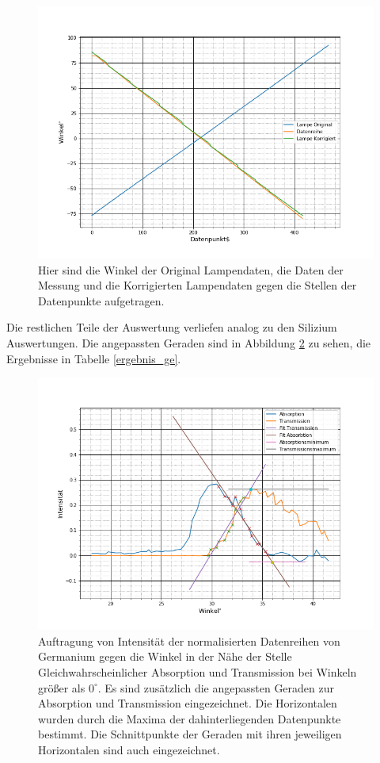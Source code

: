 \begin{figure}[h]
	\centering
	\includegraphics[scale=0.5]{Bilder/Korrektur_ge}
	\caption[Korrektur der Lampendaten Germanium]{\small Hier sind die Winkel der Original Lampendaten, die Daten der Messung und die Korrigierten Lampendaten gegen die Stellen der Datenpunkte aufgetragen.}
	\label{ge_korr_lamp}	
\end{figure}

Die restlichen Teile der Auswertung verliefen analog zu den Silizium Auswertungen. Die angepassten Geraden sind in Abbildung \ref{fit_ger} zu sehen, die Ergebnisse in Tabelle \ref{ergebnis_ge}.

\begin{figure}[h]


	\centering
	
	\includegraphics[scale=0.5]{Bilder/ge_l}
	\caption[Geraden Anpassungen Germanium Messung links]{\small Auftragung von Intensität der normalisierten Datenreihen von Germanium gegen die  Winkel in der Nähe der Stelle Gleichwahrscheinlicher Absorption und Transmission bei Winkeln größer als $0^\circ$. Es sind zusätzlich die angepassten Geraden zur Absorption und Transmission eingezeichnet. Die Horizontalen wurden durch die Maxima der dahinterliegenden Datenpunkte bestimmt. Die Schnittpunkte der Geraden mit ihren jeweiligen Horizontalen sind auch eingezeichnet.}
	\label{fit_ger}	
\end{figure}

